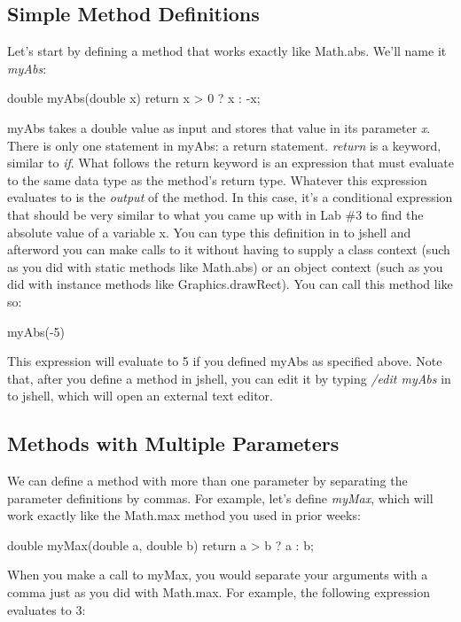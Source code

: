 \subsection{Simple Method Definitions}

Let's start by defining a method that works exactly like Math.abs. We'll name it \textit{myAbs}:

\begin{code}
double myAbs(double x) {
	return x > 0 ? x : -x;
}
\end{code}

myAbs takes a double value as input and stores that value in its parameter \textit{x}. There is only one statement in myAbs: a return statement. \textit{return} is a keyword, similar to \textit{if}. What follows the return keyword is an expression that must evaluate to the same data type as the method's return type. Whatever this expression evaluates to is the \textit{output} of the method. In this case, it's a conditional expression that should be very similar to what you came up with in Lab \#3 to find the absolute value of a variable x. You can type this definition in to jshell and afterword you can make calls to it without having to supply a class context (such as you did with static methods like Math.abs) or an object context (such as you did with instance methods like Graphics.drawRect). You can call this method like so:

\begin{code}
myAbs(-5)
\end{code}

This expression will evaluate to 5 if you defined myAbs as specified above. Note that, after you define a method in jshell, you can edit it by typing \textit{/edit myAbs} in to jshell, which will open an external text editor.

\subsection{Methods with Multiple Parameters}

We can define a method with more than one parameter by separating the parameter definitions by commas. For example, let's define \textit{myMax}, which will work exactly like the Math.max method you used in prior weeks:

\begin{code}
double myMax(double a, double b) {
	return a > b ? a : b;
}
\end{code}

When you make a call to myMax, you would separate your arguments with a comma just as you did with Math.max. For example, the following expression evaluates to 3:

